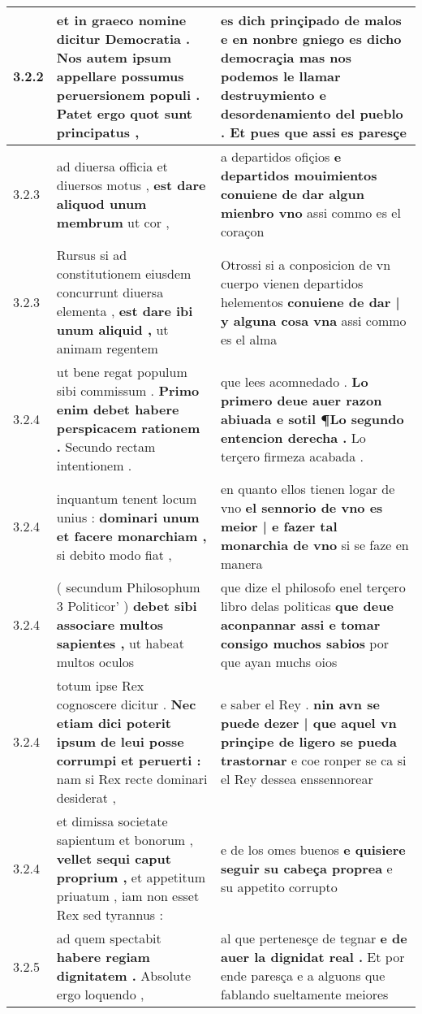\begin{tabular}{|p{1cm}|p{6.5cm}|p{6.5cm}|}
3.2.2 & et in graeco nomine dicitur Democratia . \textbf{ Nos autem ipsum appellare possumus peruersionem populi . } Patet ergo quot sunt principatus , & es dich prinçipado de malos \textbf{ e en nonbre gniego es dicho democraçia mas nos podemos le llamar destruymiento e desordenamiento del pueblo . } Et pues que assi es paresçe \\\hline
3.2.3 & ad diuersa officia et diuersos motus , \textbf{ est dare aliquod unum membrum } ut cor , & a departidos ofiçios \textbf{ e departidos mouimientos conuiene de dar algun mienbro vno } assi commo es el coraçon \\\hline
3.2.3 & Rursus si ad constitutionem eiusdem concurrunt diuersa elementa , \textbf{ est dare ibi unum aliquid , } ut animam regentem & Otrossi si a conposicion de vn cuerpo vienen departidos helementos \textbf{ conuiene de dar | y alguna cosa vna } assi commo es el alma \\\hline
3.2.4 & ut bene regat populum sibi commissum . \textbf{ Primo enim debet habere perspicacem rationem . } Secundo rectam intentionem . & que lees acomnedado . \textbf{ Lo primero deue auer razon abiuada e sotil ¶Lo segundo entencion derecha . } Lo terçero firmeza acabada . \\\hline
3.2.4 & inquantum tenent locum unius : \textbf{ dominari unum et facere monarchiam , } si debito modo fiat , & en quanto ellos tienen logar de vno \textbf{ el sennorio de vno es meior | e fazer tal monarchia de vno } si se faze en manera \\\hline
3.2.4 & ( secundum Philosophum 3 Politicor’ ) \textbf{ debet sibi associare multos sapientes , } ut habeat multos oculos & que dize el philosofo enel terçero libro delas politicas \textbf{ que deue aconpannar assi e tomar consigo muchos sabios } por que ayan muchs oios \\\hline
3.2.4 & totum ipse Rex cognoscere dicitur . \textbf{ Nec etiam dici poterit ipsum de leui posse corrumpi et peruerti : } nam si Rex recte dominari desiderat , & e saber el Rey . \textbf{ nin avn se puede dezer | que aquel vn prinçipe de ligero se pueda trastornar } e coe ronper se ca si el Rey dessea enssennorear \\\hline
3.2.4 & et dimissa societate sapientum et bonorum , \textbf{ vellet sequi caput proprium , } et appetitum priuatum , iam non esset Rex sed tyrannus : & e de los omes buenos \textbf{ e quisiere seguir su cabeça proprea } e su appetito corrupto \\\hline
3.2.5 & ad quem spectabit \textbf{ habere regiam dignitatem . } Absolute ergo loquendo , & al que pertenesçe de tegnar \textbf{ e de auer la dignidat real . } Et por ende paresça e a alguons que fablando sueltamente meiores \\\hline

\end{tabular}
